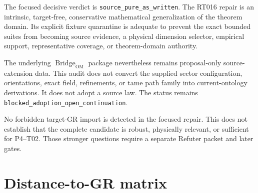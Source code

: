 \documentclass[11pt]{article}
\newcommand{\Bridge}{\operatorname{Bridge}_{\mathrm{OM}}}
\begin{document}
The focused decisive verdict is \texttt{source\_pure\_as\_written}.  The
RT016 repair is an intrinsic, target-free, conservative mathematical
generalization of the theorem domain.  Its explicit fixture quarantine is
adequate to prevent the exact bounded suites from becoming source evidence,
a physical dimension selector, empirical support, representative coverage,
or theorem-domain authority.

The underlying $\Bridge$ package nevertheless remains proposal-only
source-extension data.  This audit does not convert the supplied sector
configuration, orientations, exact field, refinements, or tame path family
into current-ontology derivations.  It does not adopt a source law.  The
status remains \texttt{blocked\_adoption\_open\_continuation}.

No forbidden target-GR import is detected in the focused repair.  This does
not establish that the complete candidate is robust, physically relevant, or
sufficient for P4--T02.  Those stronger questions require a separate Refuter
packet and later gates.

\section{Distance-to-GR matrix}
\end{document}
